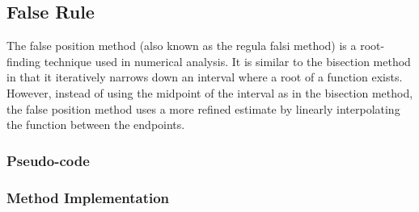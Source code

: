 \documentclass{article}
\begin{document}
\subsection{False Rule}\label{subsec:false_rule}

The false position method (also known as the regula falsi method) is a root-finding technique used in numerical analysis.
It is similar to the bisection method in that it iteratively narrows down an interval where a root of a function exists.
However, instead of using the midpoint of the interval as in the bisection method, the false position method uses a
more refined estimate by linearly interpolating the function between the endpoints.

\subsubsection{Pseudo-code}

    \subsubsection{Method Implementation}
\end{document}
